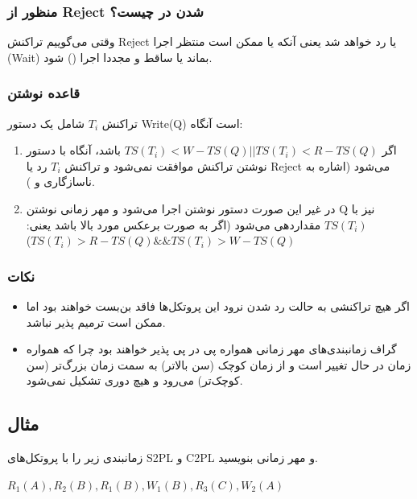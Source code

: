 \documentclass[a4paper]{article}
\begin{document}
\subsubsection*{منظور از Reject شدن در چیست؟}

وقتی می‌گوییم تراکنش Reject یا رد خواهد شد یعنی آنکه یا ممکن است منتظر اجرا
(Wait) بماند یا ساقط و مجددا اجرا () شود.

\subsubsection{قاعده نوشتن}

تراکنش $T_i$ شامل یک دستور Write(Q) است آنگاه:

\begin{enumerate}
    \item اگر $TS(T_i) < W-TS(Q) || TS(T_i) < R-TS(Q)$ باشد، آنگاه با دستور
    نوشتن تراکنش موافقت نمی‌شود و تراکنش $T_i$ رد یا Reject می‌شود (اشاره به
    ناسازگاری  و ).

    \item در غیر این صورت دستور نوشتن اجرا می‌شود و مهر زمانی نوشتن Q نیز با
    $TS(T_i)$ مقداردهی می‌شود (اگر به صورت برعکس مورد بالا باشد یعنی: $TS(T_i) >
    R-TS(Q) \&\& TS(T_i) > W-TS(Q) $)
\end{enumerate}

\subsubsection*{نکات}

\begin{itemize}
    \item اگر هیچ تراکنشی به حالت رد شدن نرود این پروتکل‌ها فاقد بن‌بست خواهند
    بود اما ممکن است ترمیم پذیر نباشد.

    \item گراف زمانبندی‌های مهر زمانی همواره پی در پی پذیر خواهند بود چرا که
    همواره زمان در حال تغییر است و از زمان کوچک (سن بالاتر) به سمت زمان بزرگ‌تر
    (سن کوچک‌تر) می‌رود و هیچ دوری تشکیل نمی‌شود.
\end{itemize}

\subsection*{مثال}

زمانبندی زیر را با پروتکل‌های S2PL و C2PL و مهر زمانی بنویسید.

\begin{LTR}
    \centering
    $R_1(A),R_2(B),R_1(B),W_1(B),R_3(C),W_2(A)$
\end{LTR}
\end{document}
